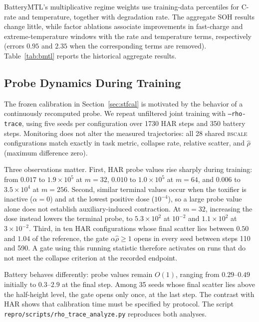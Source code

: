 \documentclass{article}
\begin{document}
BatteryMTL's multiplicative regime weights use training-data percentiles for C-rate and temperature, together with degradation rate. The aggregate SOH results change little, while factor ablations associate improvements in fast-charge and extreme-temperature windows with the rate and temperature terms, respectively (errors $0.95$ and $2.35$ when the corresponding terms are removed). Table~\ref{tab:bmtl} reports the historical aggregate results.

\subsection{Probe Dynamics During Training}\label{app:online}

The frozen calibration in Section~\ref{sec:stfcal} is motivated by the behavior of a continuously recomputed probe. We repeat unfiltered joint training with \texttt{--rho-trace}, using five seeds per configuration over 1730 HAR steps and 350 battery steps. Monitoring does not alter the measured trajectories: all 28 shared \textsc{bscale} configurations match exactly in task metric, collapse rate, relative scatter, and $\hat\rho$ (maximum difference zero).

Three observations matter. First, HAR probe values rise sharply during training: from $0.017$ to $1.9\times10^5$ at $m=32$, $0.010$ to $1.0\times10^5$ at $m=64$, and $0.006$ to $3.5\times10^4$ at $m=256$. Second, similar terminal values occur when the toxifier is inactive ($\alpha=0$) and at the lowest positive dose ($10^{-4}$), so a large probe value alone does not establish auxiliary-induced contraction. At $m=32$, increasing the dose instead lowers the terminal probe, to $5.3\times10^2$ at $10^{-2}$ and $1.1\times10^2$ at $3\times10^{-2}$. Third, in ten HAR configurations whose final scatter lies between $0.50$ and $1.04$ of the reference, the gate $\alpha\hat\rho\ge1$ opens in every seed between steps 110 and 590. A gate using this running statistic therefore activates on runs that do not meet the collapse criterion at the recorded endpoint.

Battery behaves differently: probe values remain $O(1)$, ranging from $0.29$--$0.49$ initially to $0.3$--$2.9$ at the final step. Among 35 seeds whose final scatter lies above the half-height level, the gate opens only once, at the last step. The contrast with HAR shows that calibration time must be specified by protocol. The script \texttt{repro/scripts/rho\_trace\_analyze.py} reproduces both analyses.
\end{document}
